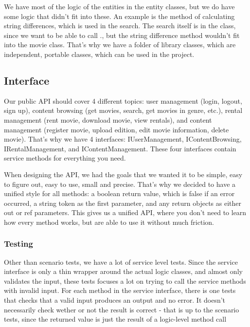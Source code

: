 We have most of the logic of the entities in the entity classes, but we do have some logic that didn't fit into these. An example is the method of calculating string differences, which is used in the search. The search itself is in the  class, since we want to be able to call ., but the string difference method wouldn't fit into the movie class. That's why we have a folder of library classes, which are independent, portable classes, which can be used in the project. 

\subsection{Interface}
\label{Design_Service_Interface}
Our public API should cover 4 different topics: user management (login, logout, sign up), content browsing (get movies, search, get movies in genre, etc.), rental management (rent movie, download movie, view rentals), and content management (register movie, upload edition, edit movie information, delete movie). That's why we have 4 interfaces: IUserManagement, IContentBrowsing, IRentalManagement, and IContentManagement. These four interfaces contain service methods for everything you need.

When designing the API, we had the goals that we wanted it to be simple, easy to figure out, easy to use, small and precise. That's why we decided to have a unified style for all methods: a boolean return value, which is false if an error occurred, a string token as the first parameter, and any return objects as either out or ref parameters. This gives us a unified API, where you don't need to learn how every method works, but are able to use it without much friction.

\subsubsection{Testing}
Other than scenario tests, we have a lot of service level tests. Since the service interface is only a thin wrapper around the actual logic classes, and almost only validates the input, these tests focuses a lot on trying to call the service methods with invalid input. For each method in the service interface, there is one tests that checks that a valid input produces an output and no error. It doesn't necessarily check wether or not the result is correct - that is up to the scenario tests, since the returned value is just the result of a logic-level method call

